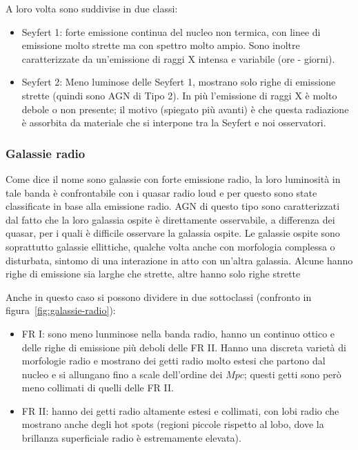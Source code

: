 A loro volta sono suddivise in due classi: 
\begin{itemize}
    \item Seyfert 1: forte emissione continua del nucleo non termica, con linee di emissione molto strette ma con spettro molto ampio. Sono inoltre caratterizzate da un'emissione di raggi X intensa e variabile (ore - giorni).
    \item Seyfert 2: Meno luminose delle Seyfert 1, mostrano solo righe di emissione strette (quindi sono AGN di Tipo 2). In più l'emissione di raggi X è molto debole o non presente; il motivo (spiegato più avanti) è che questa radiazione è assorbita da materiale che si interpone tra la Seyfert e noi osservatori. 
\end{itemize}

\subsubsection{Galassie radio}
Come dice il nome sono galassie con forte emissione radio, la loro luminosità in tale banda è confrontabile con i quasar radio loud e per questo sono state classificate in base alla emissione radio. AGN di questo tipo sono caratterizzati dal fatto che la loro galassia ospite è direttamente osservabile, a differenza dei quasar, per i quali è difficile osservare la galassia ospite. Le galassie ospite sono soprattutto galassie ellittiche, qualche volta anche con morfologia complessa o disturbata, sintomo di una interazione in atto con un'altra galassia. Alcune hanno righe di emissione sia larghe che strette, altre hanno solo righe strette 

Anche in questo caso si possono dividere in due sottoclassi (confronto in figura~\ref{fig:galassie-radio}):
\begin{itemize}
    \item FR I: sono meno lunminose nella banda radio, hanno un continuo ottico e delle righe di emissione più deboli delle FR II. Hanno una discreta varietà di morfologie radio e mostrano dei getti radio molto estesi che partono dal nucleo e si allungano fino a scale dell’ordine dei $\si{Mpc}$; questi getti sono però meno collimati di quelli delle FR II.  
    \item FR II: hanno dei getti radio altamente estesi e collimati, con lobi radio che mostrano anche degli hot spots (regioni piccole rispetto al lobo, dove la brillanza superficiale radio è estremamente elevata). 
\end{itemize}

